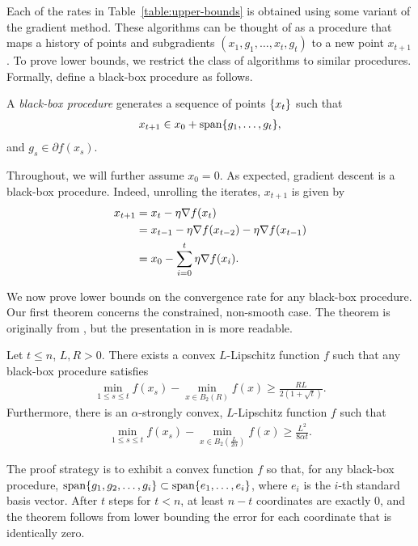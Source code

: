 Each of the rates in Table~\eqref{table:upper-bounds} is obtained using some variant of the
gradient method. These algorithms can be thought of as a procedure that
maps a history of points and subgradients $(x_1, g_1, \dots, x_t, g_t)$ to a 
new point $x_{t+1}$. To prove lower bounds, we restrict the class of algorithms 
to similar procedures. Formally, define a black-box procedure as follows.

\begin{definition}
A \textit{black-box procedure} generates a sequence of points $\{x_t\}$
such that
\begin{align}
    x_{t+1} \in x_0 + \mathop{\rm span}\{g_1, \dots, g_t\},
\end{align}
and $g_s \in \partial f (x_s)$.
\end{definition}
Throughout, we will further assume $x_0 = 0$. As expected, gradient descent is a
black-box procedure. Indeed, unrolling the iterates, $x_{t+1}$ is given by
\begin{align}
    x_{t+1} 
    &= x_t - \eta \nabla f(x_t) \\
    &= x_{t-1} - \eta \nabla f(x_{t-2}) - \eta \nabla f(x_{t-1}) \\
    &= x_0 - \sum_{i=0}^t \eta \nabla f (x_i).
\end{align}

We now prove lower bounds on the convergence rate for any black-box procedure.
Our first theorem concerns the constrained, non-smooth case.
The theorem is originally from \cite{myn1983}, but the presentation in
\cite{lecturesincvxopt} is more readable. 
~
\begin{theorem}\label{theorem:lb-non-smooth}
Let $t \leq n$, $L, R  > 0$. There exists a convex $L$-Lipschitz function $f$
such that any black-box procedure satisfies
\begin{align}
    \min_{1 \leq s \leq t} f(x_s) - \min_{x \in B_2(R)} f(x)
    \geq \frac{RL}{2(1+\sqrt{t})}.
\end{align}
Furthermore, there is an $\alpha$-strongly convex, $L$-Lipschitz function $f$
such that
\begin{align}
    \min_{1 \leq s \leq t} f(x_s) - \min_{x \in B_2(\frac{L}{2\alpha})} f(x)
    \geq \frac{L^2}{8\alpha t}.
\end{align}
\end{theorem}
The proof strategy is to exhibit a convex function $f$ so that, for any black-box procedure,
$\mathop{\rm span}\{g_1, g_2, \dots, g_i\} \subset \mathop{\rm span}\{e_1, \dots, e_i\}$, where
$e_i$ is the $i$-th standard basis vector. After $t$ steps for $t < n$, at least
$n-t$ coordinates are exactly 0, and the theorem follows from lower bounding the
error for each coordinate that is identically zero. 

